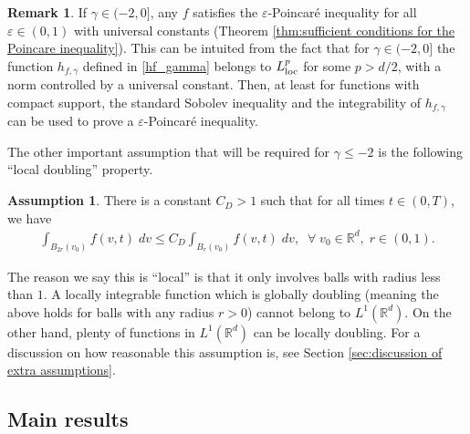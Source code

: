 \documentclass[12pt,american]{amsart}
\numberwithin{equation}{section}
\theoremstyle{plain}
\theoremstyle{definition}                  %
\newtheorem{rem}[thm]{Remark}
\newtheorem{Assumption}{Assumption}
\begin{document}
\begin{rem}\label{rem: h in Ld/2 implies epsilon Poincare} 
 If $\gamma \in (-2,0]$, any $f$ satisfies the $\varepsilon$-Poincar\'e inequality for all $\varepsilon \in (0,1)$ with universal constants (Theorem \ref{thm:sufficient conditions for the Poincare inequality}). This can be intuited from the fact that for $\gamma \in (-2,0]$ the function $ h_{f,\gamma} $ defined in \eqref{hf_gamma} belongs to $ L^{p}_{\textnormal{loc}}$ for some $p>d/2$, with a norm controlled by a universal constant. Then, at least for functions with compact support, the standard Sobolev inequality and the integrability of $h_{f,\gamma}$ can be used to prove a $\varepsilon$-Poincar\'e inequality.

 \end{rem}

The other important assumption that will be required for $\gamma \leq -2$ is the following ``local doubling'' property.
\begin{Assumption}\label{Assumption:Local Doubling}
  There is a constant $C_D>1$ such that for all times $t\in (0,T)$, we have
  \begin{align}\label{eqn:doubling local}
    \int_{B_{2r}(v_0)}f(v,t)\;dv \leq C_D\int_{B_r(v_0)}f(v,t)\;dv,\;\;\forall\;v_0\in\mathbb{R}^d,\;r\in(0,1).
  \end{align}

\end{Assumption}
  The reason we say this is ``local'' is that it only involves balls with radius less than $1$. A locally integrable function which is globally doubling (meaning the above holds for balls with any radius $r>0$) cannot belong to $L^1(\mathbb{R}^d)$. On the other hand, plenty of functions in $L^1(\mathbb{R}^d)$ can be locally doubling. For a discussion on how reasonable this assumption is, see Section \ref{sec:discussion of extra assumptions}.

\subsection{Main results}\label{section: Main result}
\end{document}

